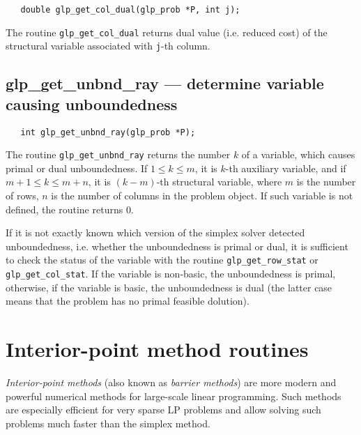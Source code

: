 \synopsis

\begin{verbatim}
   double glp_get_col_dual(glp_prob *P, int j);
\end{verbatim}

\returns

The routine \verb|glp_get_col_dual| returns dual value (i.e. reduced
cost) of the structural variable associated with \verb|j|-th column.

\subsection{glp\_get\_unbnd\_ray --- determine variable causing
unboundedness}

\synopsis

\begin{verbatim}
   int glp_get_unbnd_ray(glp_prob *P);
\end{verbatim}

\returns

The routine \verb|glp_get_unbnd_ray| returns the number $k$ of
a variable, which causes primal or dual unboundedness.
If $1\leq k\leq m$, it is $k$-th auxiliary variable, and if
$m+1\leq k\leq m+n$, it is $(k-m)$-th structural variable, where $m$ is
the number of rows, $n$ is the number of columns in the problem object.
If such variable is not defined, the routine returns 0.


If it is not exactly known which version of the simplex solver
detected unboundedness, i.e. whether the unboundedness is primal or
dual, it is sufficient to check the status of the variable
with the routine \verb|glp_get_row_stat| or \verb|glp_get_col_stat|.
If the variable is non-basic, the unboundedness is primal, otherwise,
if the variable is basic, the unboundedness is dual (the latter case
means that the problem has no primal feasible dolution).


\newpage

\section{Interior-point method routines}

{\it Interior-point methods} (also known as {\it barrier methods}) are
more modern and powerful numerical methods for large-scale linear
programming. Such methods are especially efficient for very sparse LP
problems and allow solving such problems much faster than the simplex
method.

